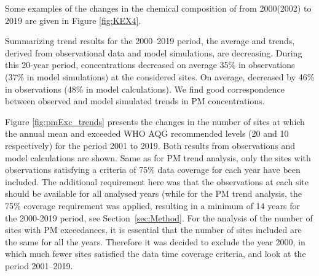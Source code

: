  Some examples of the changes in the chemical composition of \PM[2.5] from 2000(2002) to 2019 are given in Figure \ref{fig:KEX4}.

Summarizing trend results for the 2000--2019 period, the average \PM[10] and \PM[2.5] trends, derived from observational data and model simulations, are decreasing. %
During this 20-year period, \PM[10] concentrations decreased on average 35\% in observations (37\% in model simulations) at the considered sites. On average, \PM[2.5] decreased by 46\% in observations (48\% in model calculations). We find good correspondence between observed and model simulated trends in PM concentrations. 

Figure \ref{fig:pmExc_trends} presents the changes in the number of sites at which the annual mean \PM[10] and \PM[2.5] exceeded WHO AQG recommended levels (20 and 10 \ug respectively) for the period 2001 to 2019. Both results from observations and model calculations are shown. Same as for PM trend analysis, only the sites with observations satisfying a criteria of 75\% data coverage for each year have been included. The additional requirement here was that the observations at each site should be available for all analysed years (while for the PM trend analysis, the 75\% coverage requirement was applied, resulting in a minimum of 14 years for the 2000-2019 period, see Section~\ref{sec:Method}. For the analysis of the number of sites with PM exceedances, it is essential that the number of sites included are the same for all the years. Therefore it was decided to exclude the year 2000, in which much fewer sites satisfied the data time coverage criteria, and look at the period 2001--2019. 



